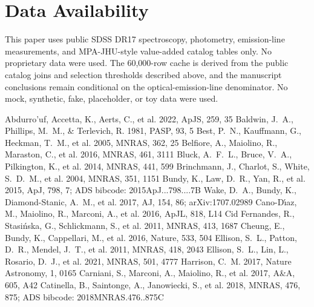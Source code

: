 \documentclass[twocolumn]{aastex631}
\begin{document}
\section*{Data Availability}
This paper uses public SDSS DR17 spectroscopy, photometry, emission-line measurements, and MPA-JHU-style value-added catalog tables only. No proprietary data were used. The 60,000-row cache is derived from the public catalog joins and selection thresholds described above, and the manuscript conclusions remain conditional on the optical-emission-line denominator. No mock, synthetic, fake, placeholder, or toy data were used.


\begin{thebibliography}{}
 Abdurro'uf, Accetta, K., Aerts, C., et al. 2022, ApJS, 259, 35
 Baldwin, J.~A., Phillips, M.~M., \& Terlevich, R. 1981, PASP, 93, 5
 Best, P.~N., Kauffmann, G., Heckman, T.~M., et al. 2005, MNRAS, 362, 25
 Belfiore, A., Maiolino, R., Maraston, C., et al. 2016, MNRAS, 461, 3111
 Bluck, A.~F.~L., Bruce, V.~A., Pilkington, K., et al. 2014, MNRAS, 441, 599
 Brinchmann, J., Charlot, S., White, S.~D.~M., et al. 2004, MNRAS, 351, 1151
 Bundy, K., Law, D.~R., Yan, R., et al. 2015, ApJ, 798, 7; ADS bibcode: 2015ApJ...798....7B
 Wake, D.~A., Bundy, K., Diamond-Stanic, A.~M., et al. 2017, AJ, 154, 86; arXiv:1707.02989
 Cano-D\'{\i}az, M., Maiolino, R., Marconi, A., et al. 2016, ApJL, 818, L14
 Cid Fernandes, R., Stasi{\'n}ska, G., Schlickmann, S., et al. 2011, MNRAS, 413, 1687
 Cheung, E., Bundy, K., Cappellari, M., et al. 2016, Nature, 533, 504
 Ellison, S.~L., Patton, D.~R., Mendel, J.~T., et al. 2011, MNRAS, 418, 2043
 Ellison, S.~L., Lin, L., Rosario, D.~J., et al. 2021, MNRAS, 501, 4777
 Harrison, C.~M. 2017, Nature Astronomy, 1, 0165
 Carniani, S., Marconi, A., Maiolino, R., et al. 2017, A\&A, 605, A42
 Catinella, B., Saintonge, A., Janowiecki, S., et al. 2018, MNRAS, 476, 875; ADS bibcode: 2018MNRAS.476..875C

\end{thebibliography}
\end{document}

